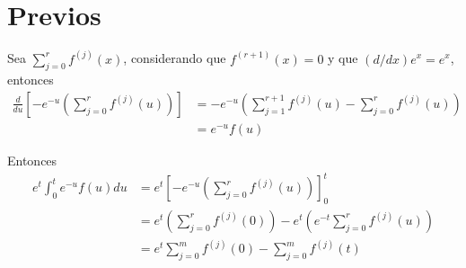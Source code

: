 \section{Previos}
\begin{cajita}

\begin{nota}
    Sea $\sum_{j=0}^{r}f^{(j)}(x)$, considerando que $f^{(r+1)}(x)=0$ y que $(d/dx)e^x=e^x$, entonces
        \begin{align*}
            \frac{d}{du}\left[-e^{-u}\left(\sum_{j=0}^{r}f^{(j)}(u)\right)\right] &= -e^{-u}\left(\sum_{j=1}^{r+1}f^{(j)}(u)- \sum_{j=0}^{r}f^{(j)}(u)\right)\\
            &= e^{-u}f(u)
        \end{align*}

        Entonces 
        \begin{align*}
            e^t\int_0^t e^{-u} f(u) d u &= e^t\left[-e^{-u}\left(\sum_{j=0}^{r}f^{(j)}(u)\right)\right]_0^t\\
            &= e^t\left(\sum_{j=0}^{r}f^{(j)}(0)\right)-e^t\left(e^{-t}\sum_{j=0}^{r}f^{(j)}(u)\right)\\
            &= e^t \sum_{j=0}^m f^{(j)}(0)-\sum_{j=0}^m f^{(j)}(t)
        \end{align*}
\end{nota}
\end{cajita}

